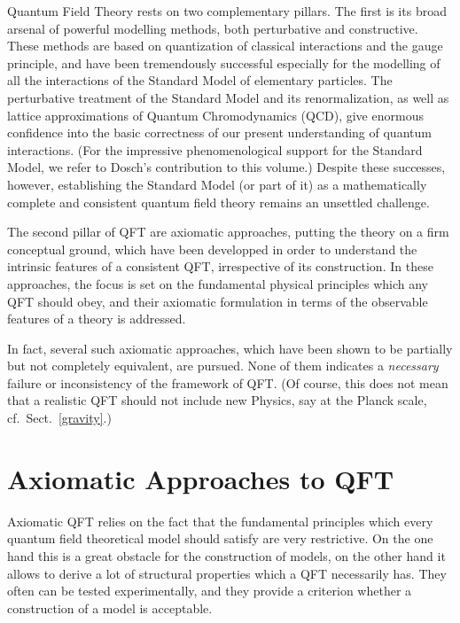 \documentclass[multphys,vecphys]{svmult}
\begin{document}
Quantum Field Theory rests on two complementary pillars. The first 
is its broad arsenal of powerful modelling methods, both 
perturbative and
constructive. These methods are based on
quantization of classical interactions and the
gauge principle, and have been tremendously
successful especially for the modelling of all the interactions of the
Standard Model of elementary particles. The perturbative treatment of
the Standard Model and its renormalization, as
well as lattice approximations of Quantum
Chromodynamics (QCD), give enormous confidence into the
basic correctness of our present  understanding of quantum
interactions. (For the impressive phenomenological support for the
Standard Model, we refer to Dosch's contribution to this volume.)
Despite these successes, however, establishing the Standard Model (or
part of it) as a mathematically complete and consistent quantum field
theory remains an unsettled challenge. 

The second pillar of QFT are axiomatic
approaches, putting the theory on a firm conceptual ground, which have
been developped in order to understand the intrinsic features of a
consistent QFT, irrespective of its construction. In these approaches,
the focus is set on the fundamental physical principles which any QFT
should obey, and their axiomatic formulation in terms of the
observable features of a theory is addressed. 

In fact, several such axiomatic approaches,
which have been shown to be partially but not completely equivalent,
are pursued. None of them indicates a {\em necessary} failure or
inconsistency of the framework of QFT. (Of course, this does not mean
that a realistic QFT should not include new Physics, say at the
Planck scale, cf.\ Sect.~\ref{gravity}.) 


\section{Axiomatic Approaches to QFT}\label{axiom}

Axiomatic QFT relies on the fact that the
fundamental principles which every quantum field theoretical model
should satisfy are very restrictive. On the one hand this is a great
obstacle for the construction of models, on the other hand it allows
to derive a lot of structural properties  which a QFT necessarily
has. They often can be tested experimentally, and they provide a
criterion whether a construction of a model is acceptable. 
\end{document}

